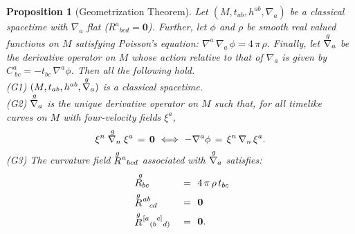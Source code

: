 \documentclass [12] {article}
\theoremstyle{plain}
\newtheorem{proposition}{Proposition}[subsection]
\numberwithin{figure}{subsection}
\numberwithin{proposition}{subsection}
\begin{document}
\begin{proposition}  [Geometrization Theorem] \label{Geometrization Theorem} Let $(M, t_{ab}, h^{ab}, \nabla_a)$ be a classical spacetime with $\nabla_a$ flat ($R^a{}_{bcd} = \mathbf{0}$).  Further,  let  $\phi$ and $\rho$  be smooth real valued functions on $M$ satisfying Poisson's equation: $\nabla^a \, \nabla_a  \, \phi  =  4  \, \pi  \, \rho.$   Finally, let  $\stackrel{g \hspace{.4em}}{\nabla_a}$ be the derivative operator on $M$ whose action relative to that of $\nabla_a$ is given by $C^a_{\ bc}  =  -t_{bc} \, \nabla^a \phi$.  Then all the following hold. \\
\indent (G1)  $(M, t_{ab}, h^{ab}, \stackrel{g \hspace{.4em}}{\nabla_a})$  is a classical spacetime. \\
\indent (G2)  $\stackrel{g \hspace{.4em}}{\nabla_a}$  is the unique derivative operator on $M$ such that, for all timelike \\
\indent  \hspace{2em} curves on $M$ with four-velocity fields $\xi^a$, 
\vspace{-.5em}
\begin{equation}  \label{geometrization condition}
\xi^n  \stackrel{g \hspace{.4em}}{\nabla_n}  \xi^a \, = \,  \mathbf{0}  \  \Longleftrightarrow  \ 
- \nabla^a \phi  \, = \, \xi^n \, \nabla_n \, \xi^a. 
\vspace{-.5em}  
\end{equation}
\indent (G3) The curvature field $\stackrel{g}{R}{}\hspace{-.2em}^a{}_{bcd}$ associated with $\stackrel{g \hspace{.4em}}{\nabla_a}$ satisfies: 
\vspace{-.6 em}
\begin{alignat}{2} 
&\stackrel{g \hspace{.3em}}{R_{bc}}  &= \ \     &4 \, \pi \,   \rho \,  t_{bc}   \label{geometric Poisson}\\
&\stackrel{g}{R}{}\hspace{-.2em}^{ab}_{\ \ cd}   &= \ \    &\mathbf{0}  \label{first integrability condition} \\
&\stackrel{g}{R}{}\hspace{-.2em}{}^{[a}{}_{(b}{}^{c]}{}_{d)} \   &= \ \      &\mathbf{0}.  \label{second integrability condition} 
\end{alignat} 
\end{proposition}
\end{document}
